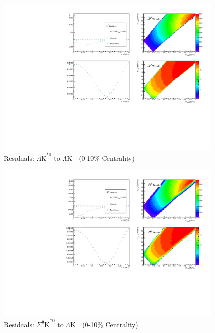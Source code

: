 \documentclass[../AnalysisNoteJBuxton.tex]{subfiles}
\begin{document}
\begin{figure}[h]
  \centering
  \includegraphics[width=\textwidth]{9_AdditionalFigures/Figures/Residuals/LamKchM/Residuals_LamKchM_0010_LamAKSt0_MomResCrctn_NonFlatBgdCrctn_ResidualsIncluded_UsingCoulombOnlyInterpCfs.pdf}
  \caption[Residuals: $\Lambda\bar{\mathrm{K}}^{*0}$ to $\Lambda$K$^{-}$ (0-10\% Centrality)]{Residuals: $\Lambda\bar{\mathrm{K}}^{*0}$ to $\Lambda$K$^{-}$ (0-10\% Centrality)}
  \label{fig:Res_LamKchM_0010_LamAKSt0}
\end{figure}


\begin{figure}[h]
  \centering
  \includegraphics[width=\textwidth]{9_AdditionalFigures/Figures/Residuals/LamKchM/Residuals_LamKchM_0010_Sig0AKSt0_MomResCrctn_NonFlatBgdCrctn_ResidualsIncluded_UsingCoulombOnlyInterpCfs.pdf}
  \caption[Residuals: $\Sigma^{0}\bar{\mathrm{K}}^{*0}$ to $\Lambda$K$^{-}$ (0-10\% Centrality)]{Residuals: $\Sigma^{0}\bar{\mathrm{K}}^{*0}$ to $\Lambda$K$^{-}$ (0-10\% Centrality)}
  \label{fig:Res_LamKchM_0010_Sig0AKSt0}
\end{figure}
\end{document}
